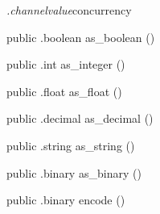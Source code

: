 \begin{CrexxClass}{\textit{.channelvalue}}{concurrency}
\begin{Members}
    \Method
      {public}
      {.boolean}
      {as\_boolean}
      {()}

    \Method
      {public}
      {.int}
      {as\_integer}
      {()}

    \Method
      {public}
      {.float}
      {as\_float}
      {()}

    \Method
      {public}
      {.decimal}
      {as\_decimal}
      {()}

    \Method
      {public}
      {.string}
      {as\_string}
      {()}

    \Method
      {public}
      {.binary}
      {as\_binary}
      {()}

    \Method
      {public}
      {.binary}
      {encode}
      {()}

  \end{Members}
\end{CrexxClass}

